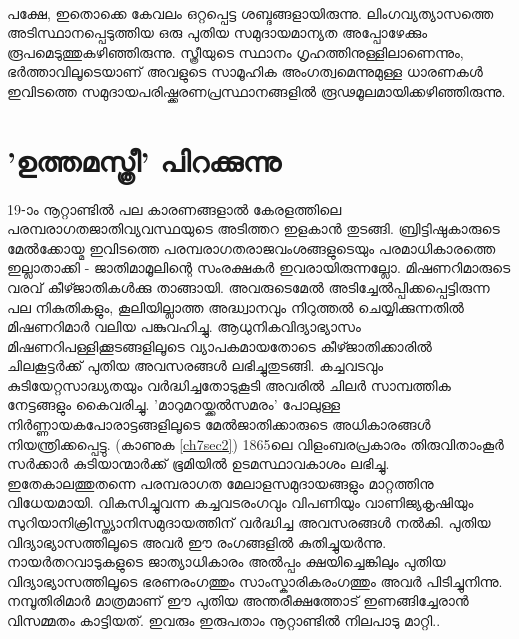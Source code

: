 \paragraph{}പക്ഷേ, ഇതൊക്കെ കേവലം ഒറ്റപ്പെട്ട ശബ്ദങ്ങളായിരുന്നു. ലിംഗവ്യത്യാസത്തെ അടിസ്ഥാനപ്പെടുത്തിയ ഒരു പുതിയ സമുദായമാന്യത അപ്പോഴേക്കും രൂപമെടുത്തുകഴിഞ്ഞിരുന്നു. സ്ത്രീയുടെ സ്ഥാനം ഗൃഹത്തിനുള്ളിലാണെന്നും, ഭർത്താവിലൂടെയാണ് അവളുടെ സാമൂഹിക അംഗത്വമെന്നുമുള്ള ധാരണകൾ ഇവിടത്തെ സമുദായപരിഷ്ക്കരണപ്രസ്ഥാനങ്ങളിൽ രൂഢമൂലമായിക്കഴിഞ്ഞിരുന്നു.


\section{'ഉത്തമസ്ത്രീ' പിറക്കുന്നു}
\label{ch4sec2}
\paragraph{}19-ാം നൂറ്റാണ്ടിൽ പല കാരണങ്ങളാൽ കേരളത്തിലെ പരമ്പരാഗതജാതിവ്യവസ്ഥയുടെ അടിത്തറ ഇളകാൻ തുടങ്ങി. ബ്രിട്ടിഷുകാരുടെ മേൽക്കോയ്മ ഇവിടത്തെ പരമ്പരാഗതരാജവംശങ്ങളുടെയും പരമാധികാരത്തെ ഇല്ലാതാക്കി - ജാതിമാമൂലിന്റെ സംരക്ഷകർ ഇവരായിരുന്നല്ലോ. മിഷണറിമാരുടെ വരവ് കീഴ്ജാതികൾക്കു താങ്ങായി. അവരുടെമേൽ അടിച്ചേൽപ്പിക്കപ്പെട്ടിരുന്ന പല നികുതികളും, കൂലിയില്ലാത്ത അദ്ധ്വാനവും നിറുത്തൽ ചെയ്യിക്കുന്നതിൽ മിഷണറിമാർ വലിയ പങ്കുവഹിച്ചു. ആധുനികവിദ്യാഭ്യാസം മിഷണറിപള്ളിക്കൂടങ്ങളിലൂടെ വ്യാപകമായതോടെ കീഴ്ജാതിക്കാരിൽ ചിലകൂട്ടർക്ക് പുതിയ അവസരങ്ങൾ ലഭിച്ചുതുടങ്ങി. കച്ചവടവും കുടിയേറ്റസാദ്ധ്യതയും വർദ്ധിച്ചതോടുകൂടി അവരിൽ ചിലർ സാമ്പത്തിക നേട്ടങ്ങളും കൈവരിച്ചു. 'മാറുമറയ്ക്കൽസമരം' പോലുള്ള നിർണ്ണായകപോരാട്ടങ്ങളിലൂടെ മേൽജാതിക്കാരുടെ അധികാരങ്ങൾ നിയന്ത്രിക്കപ്പെട്ടു. (കാണുക \ref{ch7sec2}) 1865ലെ വിളംബരപ്രകാരം തിരുവിതാംകൂർ സർക്കാർ കുടിയാന്മാർക്ക് ഭൂമിയിൽ ഉടമസ്ഥാവകാശം ലഭിച്ചു. ഇതേകാലത്തുതന്നെ പരമ്പരാഗത മേലാളസമുദായങ്ങളും മാറ്റത്തിനു വിധേയമായി. വികസിച്ചുവന്ന കച്ചവടരംഗവും വിപണിയും വാണിജ്യകൃഷിയും സുറിയാനിക്രിസ്ത്യാനിസമുദായത്തിന് വർദ്ധിച്ച അവസരങ്ങൾ നൽകി. പുതിയ വിദ്യാഭ്യാസത്തിലൂടെ അവർ ഈ രംഗങ്ങളിൽ കുതിച്ചുയർന്നു. നായർതറവാടുകളുടെ ജാത്യാധികാരം അൽപ്പം ക്ഷയിച്ചെങ്കിലും പുതിയ വിദ്യാഭ്യാസത്തിലൂടെ ഭരണരംഗത്തും സാംസ്കാരികരംഗത്തും അവർ പിടിച്ചുനിന്നു. നമ്പൂതിരിമാർ മാത്രമാണ് ഈ പുതിയ അന്തരീക്ഷത്തോട് ഇണങ്ങിച്ചേരാൻ വിസമ്മതം കാട്ടിയത്. ഇവരും ഇരുപതാം നൂറ്റാണ്ടിൽ നിലപാടു മാറ്റി..

